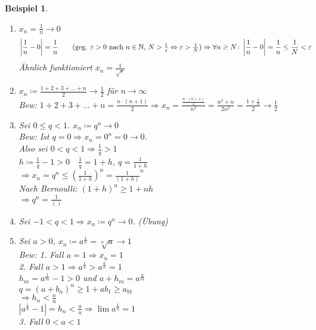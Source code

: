 \documentclass[11pt, twoside, a4paper]{article}
\theoremstyle{plain}
\newtheorem{beispiel}[blockelement]{Beispiel}
\newcommand{\pair}[1]{\left(#1\right)}
\newcommand{\abs}[1]{\left|#1\right|}
\newcommand{\equivalent}[0]{\Leftrightarrow{}}
\newcommand{\impl}[0]{\Rightarrow{}}
\newcommand{\definedas}[0]{\coloneqq}
\newcommand{\fromto}{\rightarrow{}}
\newcommand{\naturalnumbers}{\mathbb{N}}
\begin{document}
\begin{beispiel}
\begin{enumerate}
            \item $x_n = \frac{1}{n}\fromto 0$
            \begin{align*}
                \abs{\frac{1}{n}-0} &= \frac{1}{n} \tag{geg. $\varepsilon > 0$ nach $n\in\naturalnumbers$, $N>\frac{1}{\varepsilon} \equivalent \varepsilon > \frac{1}{N}$}
                \impl \forall n\geq N\colon \abs{\frac{1}{n}-0} = \frac{1}{n} \leq \frac{1}{N}< \varepsilon
            \end{align*}
            Ähnlich funktioniert $x_n = \frac{1}{\sqrt {c}}$
            \item $x_n\definedas \frac{1+2+3+\dots+n}{2} \fromto \frac{1}{2}$ für $n\fromto\infty$\\
            Bew: $1+2+3+\dots+n = \frac{n\cdot(n+1)}{2} \impl x_n = \frac{\frac{n\cdot(n+1)}{2}}{n^2} = \frac{n^2+n}{2n^2} = \frac{1+\frac{1}{n}}{2} \fromto \frac{1}{2}$
            \item Sei $0\leq q< 1$. $x_n \definedas q^n \fromto 0$\\
            Bew: Ist $q=0\impl x_n = 0^n = 0 \fromto 0$.\\
            Also sei $0<q<1 \impl \frac{1}{q}> 1$\\
            $h\definedas\frac{1}{q}-1>0\quad \frac{1}{q}= 1 + h$, $q=\frac{1}{1+h}$\\
            $\impl x_n = q^n \leq \pair{\frac{1}{1+h}}^n = \frac{1}{\pair{1+h}}^n$\\
            Nach Bernoulli: $\pair{1+h}^n\geq 1+nh$\\
            $\impl q^n = \frac{1}{()}$
            \item Sei $-1<q<1\impl x_n \definedas q^n \fromto 0$. (Übung)
            \item Sei $a>0$, $x_n\definedas a^\frac{1}{n} = \sqrt[n]{a} \fromto 1$\\
            Bew: 1. Fall $a = 1\impl x_n = 1$\\
            2. Fall $a> 1 \impl a^\frac{1}{n} > a^\frac{a}{n}=1$\\
            $h_m = a^\frac{1}{m} - 1 > 0$ und $a+h_m = a^\frac{a}{m}$\\
            $q=\pair{a+b_n}^n \geq 1+ab_1 \geq a_{b1}$\\
            $\impl h_n < \frac{a}{n}$\\
            $\abs{a^\frac{1}{n}-1} = h_n < \frac{a}{n}\impl \lim a^\frac{1}{n}= 1$\\
            3. Fall $0<a<1$\\
            \begin{align*}

\end{align*}
\end{enumerate}
\end{beispiel}
\end{document}
